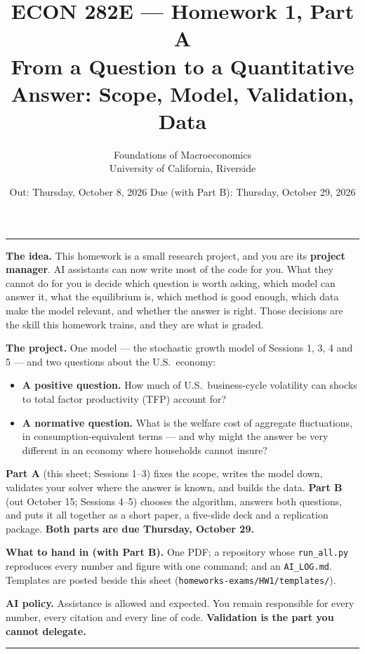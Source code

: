 \documentclass[11pt]{article}
\title{\vspace{-2em}\textbf{ECON 282E --- Homework 1, Part A}\\[2mm]
       \large From a Question to a Quantitative Answer: Scope, Model, Validation, Data}
\author{Foundations of Macroeconomics \\ University of California, Riverside}
\date{Out: Thursday, October 8, 2026 \quad\textbullet\quad Due (with Part B): Thursday, October 29, 2026}
\begin{document}
\maketitle
\thispagestyle{empty}

\noindent\rule{\linewidth}{0.4pt}\par
\small
\textbf{The idea.} This homework is a small research project, and you are its \textbf{project
manager}. AI assistants can now write most of the code for you. What they cannot do for you is
decide which question is worth asking, which model can answer it, what the equilibrium is, which
method is good enough, which data make the model relevant, and whether the answer is right. Those
decisions are the skill this homework trains, and they are what is graded.

\textbf{The project.} One model --- the stochastic growth model of Sessions 1, 3, 4 and 5 --- and
two questions about the U.S.\ economy:
\begin{itemize}[leftmargin=*,itemsep=0pt]
  \item \textbf{A positive question.} How much of U.S.\ business-cycle volatility can shocks to
        total factor productivity (TFP) account for?
  \item \textbf{A normative question.} What is the welfare cost of aggregate fluctuations, in
        consumption-equivalent terms --- and why might the answer be very different in an economy
        where households cannot insure?
\end{itemize}
\textbf{Part A} (this sheet; Sessions 1--3) fixes the scope, writes the model down, validates your
solver where the answer is known, and builds the data. \textbf{Part B} (out October 15; Sessions
4--5) chooses the algorithm, answers both questions, and puts it all together as a short paper, a
five-slide deck and a replication package. \textbf{Both parts are due Thursday, October 29.}

\textbf{What to hand in (with Part B).} One PDF; a repository whose \texttt{run\_all.py} reproduces
every number and figure with one command; and an \texttt{AI\_LOG.md}. Templates are posted beside
this sheet (\texttt{homeworks-exams/HW1/templates/}).

\textbf{AI policy.} Assistance is allowed and expected. You remain responsible for every number,
every citation and every line of code. \textbf{Validation is the part you cannot delegate.}
\normalsize\par
\noindent\rule{\linewidth}{0.4pt}\par
\end{document}
